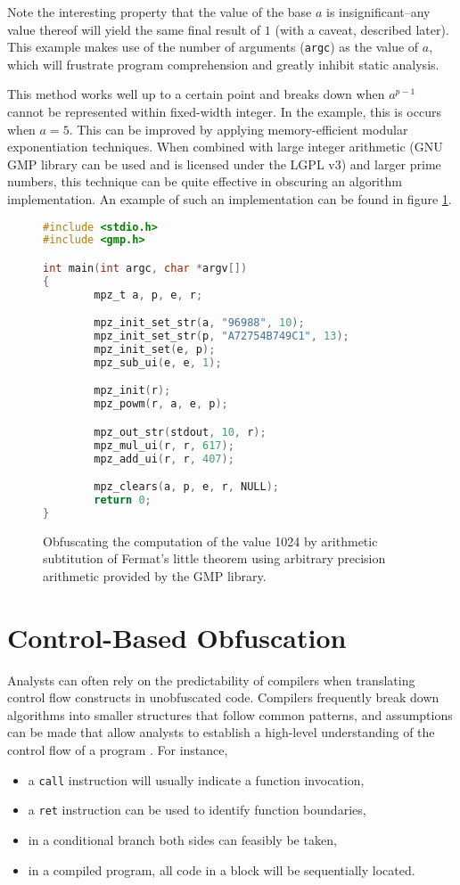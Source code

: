 \documentclass[conference]{IEEEtran}
\begin{document}
Note the interesting property that the value of the base \(a\) is insignificant--any value thereof will yield the same final result of \(1\) (with a caveat, described later). This example makes use of the number of arguments (\texttt{argc}) as the value of \(a\), which will frustrate program comprehension and greatly inhibit static analysis.

This method works well up to a certain point and breaks down when \(a^{p - 1}\) cannot be represented within fixed-width integer. In the example, this is occurs when \(a = 5\). This can be improved by applying memory-efficient modular exponentiation techniques. When combined with large integer arithmetic (GNU GMP library can be used and is licensed under the LGPL v3) and larger prime numbers, this technique can be quite effective in obscuring an algorithm implementation. An example of such an implementation can be found in figure \ref{fig:arith-sub-gmp-example}.

\begin{figure}[h]
\begin{lstlisting}[language=C,basicstyle=\footnotesize]
#include <stdio.h>
#include <gmp.h>

int main(int argc, char *argv[])
{
        mpz_t a, p, e, r;

        mpz_init_set_str(a, "96988", 10);
        mpz_init_set_str(p, "A72754B749C1", 13);
        mpz_init_set(e, p);
        mpz_sub_ui(e, e, 1);

        mpz_init(r);
        mpz_powm(r, a, e, p);

        mpz_out_str(stdout, 10, r);
        mpz_mul_ui(r, r, 617);
        mpz_add_ui(r, r, 407);

        mpz_clears(a, p, e, r, NULL);
        return 0;
}
\end{lstlisting}
\caption{Obfuscating the computation of the value 1024 by arithmetic subtitution of Fermat's little theorem using arbitrary precision arithmetic provided by the GMP library.}
\label{fig:arith-sub-gmp-example}
\end{figure}

\section{Control-Based Obfuscation}
\label{sec:ctrl-obf}
Analysts can often rely on the predictability of compilers when translating control flow constructs in unobfuscated code. Compilers frequently break down algorithms into smaller structures that follow common patterns, and assumptions can be made that allow analysts to establish a high-level understanding of the control flow of a program \cite{b7}. For instance,
\begin{itemize}
    \item a \texttt{call} instruction will usually indicate a function invocation,
    \item a \texttt{ret} instruction can be used to identify function boundaries,
    \item in a conditional branch both sides can feasibly be taken,
    \item in a compiled program, all code in a block will be sequentially located.
\end{itemize}
\end{document}
